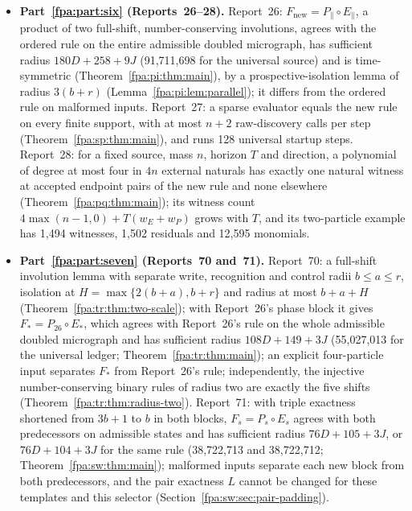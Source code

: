 \documentclass[11pt,a4paper]{article}
\numberwithin{equation}{section}
\begin{document}
\begin{itemize}
\item \textbf{Part~\ref{fpa:part:six} (Reports~26--28).} Report~26: $F_{\mathrm{new}}=P_\parallel\circ E_\parallel$, a product of two full-shift, number-conserving involutions, agrees with the ordered rule on the entire admissible doubled micrograph, has sufficient radius $180D+258+9J$ (91,711,698 for the universal source) and is time-symmetric (Theorem~\ref{fpa:pi:thm:main}), by a prospective-isolation lemma of radius $3(b+r)$ (Lemma~\ref{fpa:pi:lem:parallel}); it differs from the ordered rule on malformed inputs. Report~27: a sparse evaluator equals the new rule on every finite support, with at most $n+2$ raw-discovery calls per step (Theorem~\ref{fpa:sp:thm:main}), and runs 128 universal startup steps. Report~28: for a fixed source, mass $n$, horizon $T$ and direction, a polynomial of degree at most four in $4n$ external naturals has exactly one natural witness at accepted endpoint pairs of the new rule and none elsewhere (Theorem~\ref{fpa:pq:thm:main}); its witness count $4\max(n-1,0)+T(w_E+w_P)$ grows with $T$, and its two-particle example has 1,494 witnesses, 1,502 residuals and 12,595 monomials.
\item \textbf{Part~\ref{fpa:part:seven} (Reports~70 and~71).} Report~70: a full-shift involution lemma with separate write, recognition and control radii $b\le a\le r$, isolation at $H=\max\{2(b+a),b+r\}$ and radius at most $b+a+H$ (Theorem~\ref{fpa:tr:thm:two-scale}); with Report~26's phase block it gives $F_*=P_{26}\circ E_*$, which agrees with Report~26's rule on the whole admissible doubled micrograph and has sufficient radius $108D+149+3J$ (55,027,013 for the universal ledger; Theorem~\ref{fpa:tr:thm:main}); an explicit four-particle input separates $F_*$ from Report~26's rule; independently, the injective number-conserving binary rules of radius two are exactly the five shifts (Theorem~\ref{fpa:tr:thm:radius-two}). Report~71: with triple exactness shortened from $3b+1$ to $b$ in both blocks, $F_s=P_s\circ E_s$ agrees with both predecessors on admissible states and has sufficient radius $76D+105+3J$, or $76D+104+3J$ for the same rule (38,722,713 and 38,722,712; Theorem~\ref{fpa:sw:thm:main}); malformed inputs separate each new block from both predecessors, and the pair exactness $L$ cannot be changed for these templates and this selector (Section~\ref{fpa:sw:sec:pair-padding}).
\end{itemize}
\end{document}
